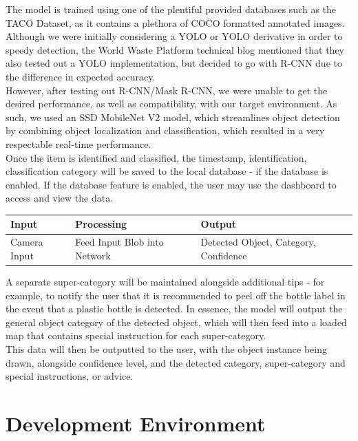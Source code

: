 \documentclass[conference]{IEEEtran}
\begin{document}
The model is trained using one of the plentiful provided databases such as the TACO Dataset, as it contains a plethora of COCO formatted annotated images. Although we were initially considering a YOLO or YOLO derivative in order to speedy detection, the World Waste Platform technical blog mentioned that they also tested out a YOLO implementation, but decided to go with R-CNN due to the difference in expected accuracy.\\

However, after testing out R-CNN/Mask R-CNN, we were unable to get the desired performance, as well as compatibility, with our target environment. As such, we used an SSD MobileNet V2 model, which streamlines object detection by combining object localization and classification, which resulted in a very respectable real-time performance. \\

Once the item is identified and classified, the timestamp, identification, classification category will be saved to the local database - if the database is enabled. If the database feature is enabled, the user may use the dashboard to access and view the data.

\begin{table}[htbp]
    \begin{tabular}{|p{2cm}|p{2.9cm}|p{2.9cm}|}
    \hline
    \textbf{Input} & \textbf{Processing} & \textbf{Output}\\ \hline
    Camera Input & Feed Input Blob into Network & Detected Object, Category, Confidence \\ \hline
    \end{tabular}
\end{table}

A separate super-category will be maintained alongside additional tips - for example, to notify the user that it is recommended to peel off the bottle label in the event that a plastic bottle is detected. In essence, the model will output the general object category of the detected object, which will then feed into a loaded map that contains special instruction for each super-category.\\

This data will then be outputted to the user, with the object instance being drawn, alongside confidence level, and the detected category, super-category and special instructions, or advice.

\newpage
\section{Development Environment}
\end{document}
